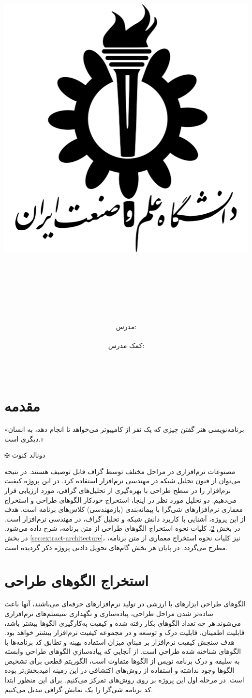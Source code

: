 \documentclass[a4paper,12pt]{article}
\title{\includegraphics[width=0.25\linewidth]{./logo.pdf}\\{\fontsize{16}{0}\nastaliq{\faculty}} \\ \BoldTitle \\ \large{\Subtitle} \\ }
\author{
	مدرس: \\  \lecturer
 \\کمک مدرس:  \\ \teachingassist
	\\
	 \\  
}
\begin{document}
\begin{mybox}
	\clearpage\maketitle
	\thispagestyle{empty}
	\maketitle
\end{mybox}
\pagestyle{fancy}
\newpage
\tableofcontents
\clearpage
{}

\section{مقدمه}
\thispagestyle{plain}
\epigraph{
	«برنامه‌نویسی هنر گفتن چیزی که یک نفر از کامپیوتر می‌خواهد تا انجام دهد، به انسان دیگری است.»
}
{$ \maltese $ {\large دونالد کنوث}}
\vspace{1cm}
\noindent
مصنوعات نرم‌افزاری در مراحل مختلف توسط گراف‌ قابل توصیف هستند. در نتیجه می‌توان از فنون تحلیل شبکه در مهندسی نرم‌افزار استفاده کرد. در این پروژه کیفیت نرم‌افزار را در سطح طراحی با بهره‌گیری از تحلیل‌های گرافی، مورد ارزیابی قرار می‌دهیم.
دو تحلیل مورد نظر در اینجا، استخراج خودکار الگوهای طراحی و استخراج معماری نرم‌افزارهای شی‌گرا با پیمانه‌بندی (بازمهندسی) کلاس‌های برنامه است. هدف از این پروژه، آشنایی با کاربرد دانش شبکه و تحلیل گراف، در مهندسی نرم‌افزار است. در بخش 
\ref{sec:design-pattern-extraction}،
کلیات نحوه استخراج الگوهای طراحی از متن برنامه، شرح داده می‌شود. در بخش 
\ref{sec:extract-architecture}،
نیز کلیات نحوه استخراج معماری از متن برنامه، مطرح می‌گردد. در پایان هر بخش گام‌های تحویل دادنی پروژه ذکر گردیده است.


\section{استخراج الگوهای طراحی}\label{sec:design-pattern-extraction}
الگوهای طراحی ابزارهای با ارزشی در توليد نرم‌افزارهای حرفه‌ای می‌باشند، آنها باعث ساده‌تر شدن مراحل طراحی، پياده‌سازی و نگهداری سيستم‌های نرم‌افزاری می‌شوند.هر چه تعداد الگوهاي بکار رفته شده و کيفيت به‌کارگيری‌ الگوها بيشتر باشد، قابليت اطمينان، قابليت درک و توسعه و در مجموعه کيفيت نرم‌افزار بيشتر خواهد بود. هدف سنجش کيفيت نرم‌افزار بر مبناي ميزان استفاده بهينه و تطابق کد برنامه‌ها با الگوهای شناخته شده طراحي است. از آنجايي که پياده‌سازي الگوهای طراحي وابسته به سليقه و درک برنامه نويس از الگوها متفاوت است، الگوریتم‌ قطعی برای تشخیص الگوها وجود نداشته و استفاده از روش‌های اکتشافی در این زمینه امیدبخش‌تر بوده است. در مرحله اول این پروژه بر روی روش‌های  تمرکز می‌کنیم. برای این منظور ابتدا کد برنامه شی‌گرا را یک نمایش گرافی تبدیل‌ می‌کنیم.
\end{document}
